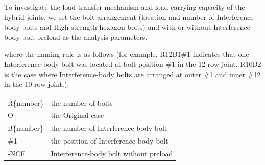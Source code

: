 To investigate the load-transfer mechanism and load-carrying capacity of the hybrid joints, we set the bolt arrangement (location and number of Interference-body bolts and High-strength hexagon bolts) and with or without Interference-body bolt preload as the analysis parameters. \par  
where the naming rule is as follows (for example, R12B1\#1 indicates that one Interference-body bolt was located at bolt position \#1 in the 12-row joint. R10B2 is the case where Interference-body bolts are arranged at outer \#1 and inner \#12 in the 10-row joint.):

\begin{tabular}{lp{6cm}}
    R\{number\} &  the number of bolts \\
    O &  the Original case \\
    B\{number\} &  the number of Interference-body bolt \\
    \#1 & the position of Interference-body bolt\\
    -NCF & Interference-body bolt without preload\\
\end{tabular}

